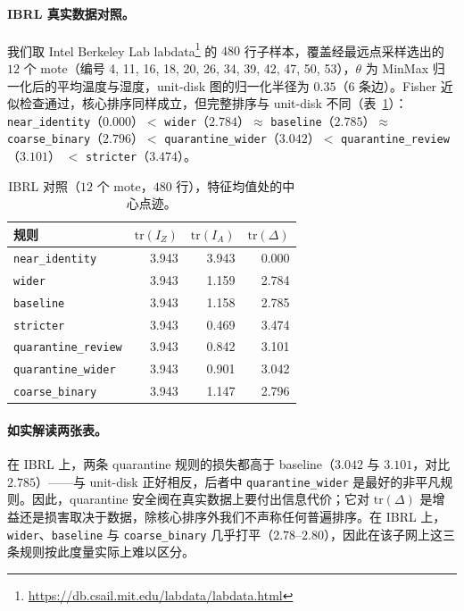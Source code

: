 \documentclass[11pt,a4paper]{article}
\begin{document}
\paragraph{IBRL 真实数据对照。}
我们取 Intel Berkeley Lab labdata\footnote{\url{https://db.csail.mit.edu/labdata/labdata.html}} 的 $480$ 行子样本，覆盖经最远点采样选出的 $12$ 个 mote（编号 4, 11, 16, 18, 20, 26, 34, 39, 42, 47, 50, 53），$\theta$ 为 MinMax 归一化后的平均温度与湿度，unit-disk 图的归一化半径为 $0.35$（$6$ 条边）。Fisher 近似检查通过，核心排序同样成立，但完整排序与 unit-disk 不同（表~\ref{tab:ibrl}）：
\texttt{near\_identity}（$0.000$）$<$ \texttt{wider}（$2.784$）$\approx$
\texttt{baseline}（$2.785$）$\approx$ \texttt{coarse\_binary}（$2.796$）$<$
\texttt{quarantine\_wider}（$3.042$）$<$ \texttt{quarantine\_review}（$3.101$）
$<$ \texttt{stricter}（$3.474$）。

\begin{table}[t]
\centering
\caption{IBRL 对照（$12$ 个 mote，$480$ 行），特征均值处的中心点迹。}
\label{tab:ibrl}
\begin{tabular}{lrrr}
\toprule
规则 & $\mathrm{tr}(I_Z)$ & $\mathrm{tr}(I_A)$ & $\mathrm{tr}(\Delta)$ \\
\midrule
\texttt{near\_identity} & 3.943 & 3.943 & 0.000 \\
\texttt{wider} & 3.943 & 1.159 & 2.784 \\
\texttt{baseline} & 3.943 & 1.158 & 2.785 \\
\texttt{stricter} & 3.943 & 0.469 & 3.474 \\
\texttt{quarantine\_review} & 3.943 & 0.842 & 3.101 \\
\texttt{quarantine\_wider} & 3.943 & 0.901 & 3.042 \\
\texttt{coarse\_binary} & 3.943 & 1.147 & 2.796 \\
\bottomrule
\end{tabular}
\end{table}

\paragraph{如实解读两张表。}
在 IBRL 上，两条 quarantine 规则的损失都高于 baseline（$3.042$ 与 $3.101$，对比 $2.785$）——与 unit-disk 正好相反，后者中 \texttt{quarantine\_wider} 是最好的非平凡规则。因此，quarantine 安全阀在真实数据上要付出信息代价；它对 $\mathrm{tr}(\Delta)$ 是增益还是损害取决于数据，除核心排序外我们不声称任何普遍排序。在 IBRL 上，\texttt{wider}、\texttt{baseline} 与 \texttt{coarse\_binary} 几乎打平（$2.78$--$2.80$），因此在该子网上这三条规则按此度量实际上难以区分。
\end{document}
